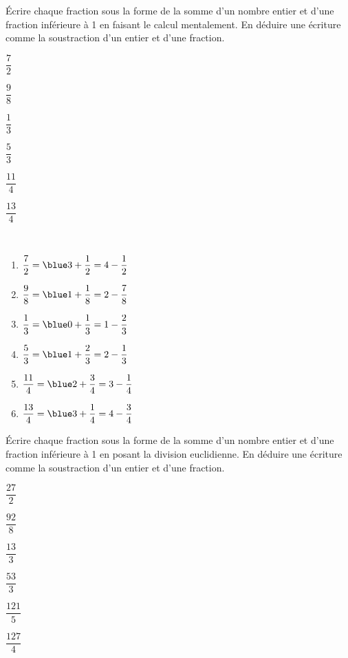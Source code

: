 \begin{colonne*exercice}


\begin{exercice} %
   Écrire chaque fraction sous la forme de la somme d'un nombre entier et d'une fraction inférieure à 1 en faisant le calcul mentalement. En déduire une écriture comme la soustraction d'un entier et d'une fraction. \bigskip
   \begin{colenumerate}{3}
      \item $\dfrac72$ \medskip
      \item $\dfrac98$
      \item $\dfrac13$
      \item $\dfrac53$
      \item $\dfrac{11}{4}$
      \item $\dfrac{13}{4}$
   \end{colenumerate}
\end{exercice}

\begin{corrige}
   \ \\ [-5mm]
   \begin{enumerate}
      \item $\dfrac72 =\blue 3+\dfrac12 =4-\dfrac12$ \medskip
      \item $\dfrac98 =\blue 1+\dfrac18 =2-\dfrac78$ \medskip
      \item $\dfrac13 =\blue 0+\dfrac13 =1-\dfrac23$ \medskip
      \item $\dfrac53 =\blue 1+\dfrac23 =2-\dfrac13$ \medskip
      \item $\dfrac{11}{4} =\blue 2+\dfrac34 =3-\dfrac14$ \medskip
      \item $\dfrac{13}{4} =\blue 3+\dfrac14 =4-\dfrac34$
   \end{enumerate}
\end{corrige}

\bigskip


\begin{exercice} %
   Écrire chaque fraction sous la forme de la somme d'un nombre entier et d'une fraction inférieure à 1 en posant la division euclidienne. En déduire une écriture comme la soustraction d'un entier et d'une fraction. \bigskip
   \begin{colenumerate}{3}
      \item $\dfrac{27}2$ \medskip
      \item $\dfrac{92}8$
      \item $\dfrac{13}{3}$
      \item $\dfrac{53}{3}$
      \item $\dfrac{121}{5}$
      \item $\dfrac{127}{4}$
   \end{colenumerate}
\end{exercice}


\end{colonne*exercice}
